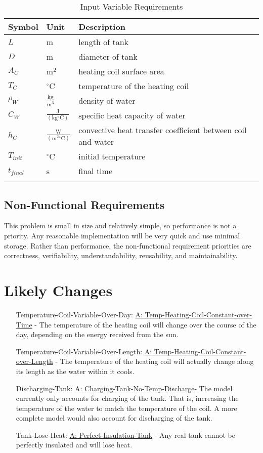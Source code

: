 \documentclass[12pt]{article}
\begin{document}
\begin{longtabu}{l l X[l]}
\toprule
Symbol & Unit & Description
\\
\midrule
$L$ & m & length of tank
\\
$D$ & m & diameter of tank
\\
${A_{C}}$ & $\text{m}^{2}$ & heating coil surface area
\\
${T_{C}}$ & ${}^{\circ}$C & temperature of the heating coil
\\
${ρ_{W}}$ & $\frac{\text{kg}}{\text{m}^{3}}$ & density of water
\\
${C_{W}}$ & $\frac{\text{J}}{(\text{kg}{}^{\circ}\text{C})}$ & specific heat capacity of water
\\
${h_{C}}$ & $\frac{\text{W}}{(\text{m}^{2}{}^{\circ}\text{C})}$ & convective heat transfer coefficient between coil and water
\\
${T_{init}}$ & ${}^{\circ}$C & initial temperature
\\
${t_{final}}$ & s & final time
\\
\bottomrule
\caption{Input Variable Requirements}
\label{Table:Input-Variable-Requirements}
\end{longtabu}
\subsection{Non-Functional Requirements}
\label{Sec:NFRs}
This problem is small in size and relatively simple, so performance is not a priority. Any reasonable implementation will be very quick and use minimal storage. Rather than performance, the non-functional requirement priorities are correctness, verifiability, understandability, reusability, and maintainability.
\section{Likely Changes}
\label{Sec:LCs}
\begin{itemize}
\item[Temperature-Coil-Variable-Over-Day:\phantomsection\label{likeChgTCVOD}]\hyperref[A:Temp-Heating-Coil-Constant-over-Time]{A: Temp-Heating-Coil-Constant-over-Time} - The temperature of the heating coil will change over the course of the day, depending on the energy received from the sun.
\item[Temperature-Coil-Variable-Over-Length:\phantomsection\label{likeChgTCVOL}]\hyperref[A:Temp-Heating-Coil-Constant-over-Length]{A: Temp-Heating-Coil-Constant-over-Length} - The temperature of the heating coil will actually change along its length as the water within it cools.
\item[Discharging-Tank:\phantomsection\label{likeChgDT}]\hyperref[A:Charging-Tank-No-Temp-Discharge]{A: Charging-Tank-No-Temp-Discharge}- The model currently only accounts for charging of the tank. That is, increasing the temperature of the water to match the temperature of the coil. A more complete model would also account for discharging of the tank.
\item[Tank-Lose-Heat:\phantomsection\label{likeChgTLH}]\hyperref[A:Perfect-Insulation-Tank]{A: Perfect-Insulation-Tank} - Any real tank cannot be perfectly insulated and will lose heat.
\end{itemize}
\end{document}
